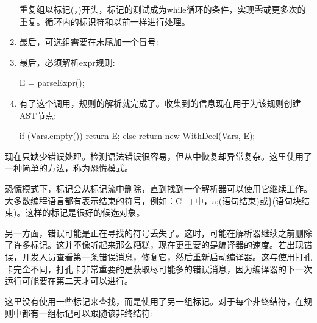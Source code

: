 \begin{enumerate}
重复组以标记(，)开头，标记的测试成为while循环的条件，实现零或更多次的重复。循环内的标识符和以前一样进行处理。

\item
最后，可选组需要在末尾加一个冒号:

\begin{cpp}
    if (consume(Token::colon))
        goto _error;
}
\end{cpp}

\item
最后，必须解析expr规则:

\begin{cpp}
    E = parseExpr();
\end{cpp}

\item
有了这个调用，规则的解析就完成了。收集到的信息现在用于为该规则创建AST节点:

\begin{cpp}
    if (Vars.empty()) return E;
    else return new WithDecl(Vars, E);
\end{cpp}
\end{enumerate}

现在只缺少错误处理。检测语法错误很容易，但从中恢复却异常复杂。这里使用了一种简单的方法，称为恐慌模式。

恐慌模式下，标记会从标记流中删除，直到找到一个解析器可以使用它继续工作。大多数编程语言都有表示结束的符号，例如：C++中，a;(语句结束)或\}(语句块结束)。这样的标记是很好的候选对象。

另一方面，错误可能是正在寻找的符号丢失了。这时，可能在解析器继续之前删除了许多标记。这并不像听起来那么糟糕，现在更重要的是编译器的速度。若出现错误，开发人员查看第一条错误消息，修复它，然后重新启动编译器。这与使用打孔卡完全不同，打孔卡非常重要的是获取尽可能多的错误消息，因为编译器的下一次运行可能要在第二天才可以进行。


这里没有使用一些标记来查找，而是使用了另一组标记。对于每个非终结符，在规则中都有一组标记可以跟随该非终结符:


